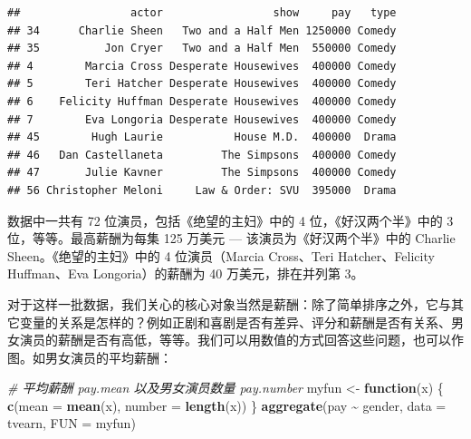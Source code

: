 \documentclass[
  b5paper,
  UTF8,twoside]{book}
\newenvironment{Shaded}{\begin{snugshade}}{\end{snugshade}}
\newcommand{\AttributeTok}[1]{\textcolor[rgb]{0.13,0.29,0.53}{#1}}
\newcommand{\CommentTok}[1]{\textcolor[rgb]{0.56,0.35,0.01}{\textit{#1}}}
\newcommand{\ConstantTok}[1]{\textcolor[rgb]{0.56,0.35,0.01}{#1}}
\newcommand{\ControlFlowTok}[1]{\textcolor[rgb]{0.13,0.29,0.53}{\textbf{#1}}}
\newcommand{\DecValTok}[1]{\textcolor[rgb]{0.00,0.00,0.81}{#1}}
\newcommand{\FunctionTok}[1]{\textcolor[rgb]{0.13,0.29,0.53}{\textbf{#1}}}
\newcommand{\NormalTok}[1]{#1}
\newcommand{\OtherTok}[1]{\textcolor[rgb]{0.56,0.35,0.01}{#1}}
\newcommand{\SpecialCharTok}[1]{\textcolor[rgb]{0.81,0.36,0.00}{\textbf{#1}}}
\newcommand{\StringTok}[1]{\textcolor[rgb]{0.31,0.60,0.02}{#1}}
\begin{document}
\begin{Shaded}
\end{Shaded}

\begin{verbatim}
##                 actor                 show     pay   type
## 34      Charlie Sheen   Two and a Half Men 1250000 Comedy
## 35          Jon Cryer   Two and a Half Men  550000 Comedy
## 4        Marcia Cross Desperate Housewives  400000 Comedy
## 5        Teri Hatcher Desperate Housewives  400000 Comedy
## 6    Felicity Huffman Desperate Housewives  400000 Comedy
## 7        Eva Longoria Desperate Housewives  400000 Comedy
## 45        Hugh Laurie           House M.D.  400000  Drama
## 46   Dan Castellaneta         The Simpsons  400000 Comedy
## 47       Julie Kavner         The Simpsons  400000 Comedy
## 56 Christopher Meloni     Law & Order: SVU  395000  Drama
\end{verbatim}

数据中一共有 72 位演员，包括《绝望的主妇》中的 4 位，《好汉两个半》中的 3 位，等等。最高薪酬为每集 125 万美元 --- 该演员为《好汉两个半》中的 Charlie Sheen。《绝望的主妇》中的 4 位演员（Marcia Cross、Teri Hatcher、Felicity Huffman、Eva Longoria）的薪酬为 40 万美元，排在并列第 3。

对于这样一批数据，我们关心的核心对象当然是薪酬：除了简单排序之外，它与其它变量的关系是怎样的？例如正剧和喜剧是否有差异、评分和薪酬是否有关系、男女演员的薪酬是否有高低，等等。我们可以用数值的方式回答这些问题，也可以作图。如男女演员的平均薪酬：

\begin{Shaded}
\begin{Highlighting}[]
\CommentTok{\# 平均薪酬 pay.mean 以及男女演员数量 pay.number}
\NormalTok{myfun }\OtherTok{\textless{}{-}} \ControlFlowTok{function}\NormalTok{(x) \{}
 \FunctionTok{c}\NormalTok{(}\AttributeTok{mean =} \FunctionTok{mean}\NormalTok{(x), }\AttributeTok{number =} \FunctionTok{length}\NormalTok{(x))}
\NormalTok{\}}
\FunctionTok{aggregate}\NormalTok{(pay }\SpecialCharTok{\textasciitilde{}}\NormalTok{ gender, }\AttributeTok{data =}\NormalTok{ tvearn, }\AttributeTok{FUN =}\NormalTok{ myfun)}
\end{Highlighting}
\end{Shaded}
\end{document}
